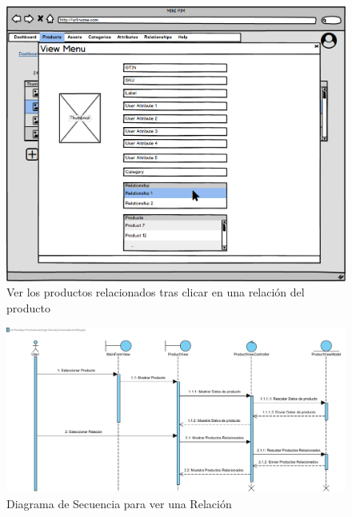 \begin{figure}[H]
    \includegraphics[width=1\linewidth]{assets/mockups/RF5.2_2.png}
    \caption{Ver los productos relacionados tras clicar en una relación del producto}
   \end{figure}
\vspace{1.0cm}

\newpage %

\begin{figure}[H]
    \includegraphics[width=1\linewidth]{assets/sequence/Visualizar.jpg}
    \caption{Diagrama de Secuencia para ver una Relación}
   \end{figure}
\vspace{1.0cm}

\newpage %